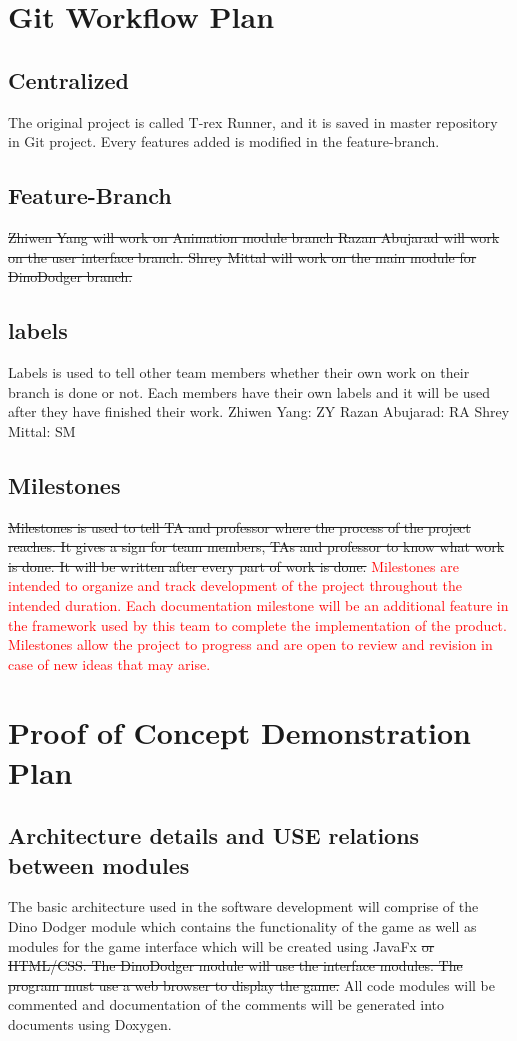 \documentclass{article}
\begin{document}
\section{Git Workflow Plan}
\subsection{Centralized}
The original project is called T-rex Runner, and it is saved in master repository in Git project. Every features added is modified in the feature-branch.
\subsection{Feature-Branch}
\sout{Zhiwen Yang will work on Animation module branch
Razan Abujarad will work on the user interface branch.
Shrey Mittal will work on the main module for DinoDodger branch.}
\subsection{labels}
Labels is used to tell other team members whether their own work on their branch is done or not. 
\newline
Each members have their own labels and it will be used after they have finished their work.
Zhiwen Yang: ZY
Razan Abujarad: RA
Shrey Mittal: SM
\subsection{Milestones}
\sout{Milestones is used to tell TA and professor where the process of the project reaches. It gives a sign for team members, TAs and professor to know what work is done. It will be written after every part of work is done.} \textcolor{red}{Milestones are intended to organize and track development of the project throughout the intended duration. Each documentation milestone will be an additional feature in the framework used by this team to complete the implementation of the product. Milestones allow the project to progress and are open to review and revision in case of new ideas that may arise.}

\section{Proof of Concept Demonstration Plan}
\subsection{Architecture details and USE relations between modules}
The basic architecture used in the software development will comprise of the Dino Dodger module which contains the functionality of the game as well as modules for the game interface which will be created using JavaFx \sout{or HTML/CSS.
The DinoDodger module will use the interface modules. The program must use a web browser to display the game.}
All code modules will be commented and documentation of the comments  will be generated into documents using Doxygen.
\end{document}
